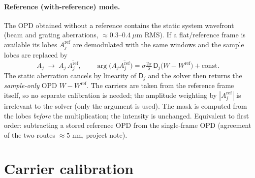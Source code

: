 \documentclass[11pt,a4paper]{article}
\theoremstyle{definition}
\newcommand{\Dop}{\mathsf{D}}
\begin{document}
\paragraph{Reference (with-reference) mode.}
The OPD obtained without a reference contains the static system wavefront (beam and grating aberrations, $\approx0.3$--$0.4\ \mu$m RMS). If a flat/reference frame is available its lobes $A_j^{\mathrm{ref}}$ are demodulated with the
same windows and the sample lobes are replaced by
\begin{equation}
A_j\;\longrightarrow\;A_j\,\overline{A_j^{\mathrm{ref}}},\qquad
\arg\big(A_j\overline{A_j^{\mathrm{ref}}}\big)=\sigma\tfrac{2\pi}{\lambda}\,\Dop_j\big(W-W^{\mathrm{ref}}\big)+\text{const}.
\end{equation}
The static aberration cancels by linearity of $\Dop_j$ and the solver then returns the \emph{sample-only} OPD $W-W^{\mathrm{ref}}$. The carriers are taken from the reference frame itself, so no separate calibration is needed;
the amplitude weighting by $|A_j^{\mathrm{ref}}|$ is irrelevant to the solver (only the argument is used). The mask is computed from the lobes \emph{before} the multiplication; the intensity is unchanged.
Equivalent to first order: subtracting a stored reference OPD from the single-frame OPD (agreement of the two routes $\approx5$ nm, project note).

\section{Carrier calibration}
\label{sec:calib}
\end{document}
